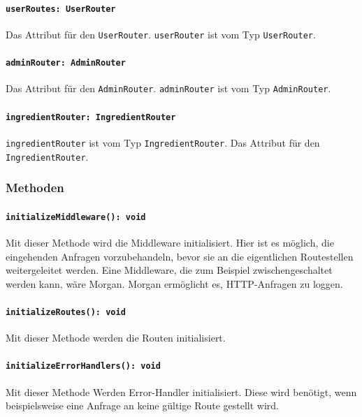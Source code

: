 \documentclass{entwurfsheft}
\begin{document}
\paragraph{\texttt{userRoutes: UserRouter}}
Das Attribut für den \texttt{UserRouter}. \texttt{userRouter} ist vom Typ \newline
\texttt{UserRouter}.
\paragraph{\texttt{adminRouter: AdminRouter}}
Das Attribut für den \texttt{AdminRouter}. \texttt{adminRouter} ist vom Typ \texttt{AdminRouter}.
\paragraph{\texttt{ingredientRouter: IngredientRouter}}
\texttt{ingredientRouter} ist vom Typ \texttt{IngredientRouter}.
Das Attribut für den \texttt{IngredientRouter}. \newline

\subsubsection*{Methoden}
\paragraph{\texttt{initializeMiddleware(): void}}
Mit dieser Methode wird die Middleware initialisiert. Hier ist es möglich, die eingehenden Anfragen vorzubehandeln, bevor sie an die eigentlichen Routestellen weitergeleitet werden.
Eine Middleware, die zum Beispiel zwischengeschaltet werden kann, wäre Morgan. Morgan ermöglicht es, HTTP-Anfragen zu loggen.
\paragraph{\texttt{initializeRoutes(): void}}
Mit dieser Methode werden die Routen initialisiert.
\paragraph{\texttt{initializeErrorHandlers(): void}}
Mit dieser Methode Werden Error-Handler initialisiert. Diese wird benötigt, wenn beispielsweise eine Anfrage an keine gültige Route gestellt wird.

\newpage
\end{document}
